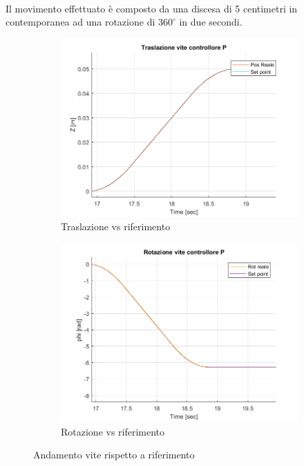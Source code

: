 \\Il movimento effettuato è composto da una discesa di 5 centimetri in contemporanea ad una rotazione di $360^\circ$ in due secondi.
\begin{figure}
	\begin{subfigure}{.5\textwidth}
		\includegraphics[width=1\linewidth]{Immagini/Traiettorie/TrasViteP}  
		\caption{Traslazione vs riferimento}
		\label{fig:sub-v0}
	\end{subfigure}
	\begin{subfigure}{.5\textwidth}
		\includegraphics[width=1\linewidth]{Immagini/Traiettorie/RotViteP}  
		\caption{Rotazione vs riferimento}
		\label{fig:sub-v01}
	\end{subfigure}
	\caption{Andamento vite rispetto a riferimento}
	\label{fig:ViteP}
\end{figure}
